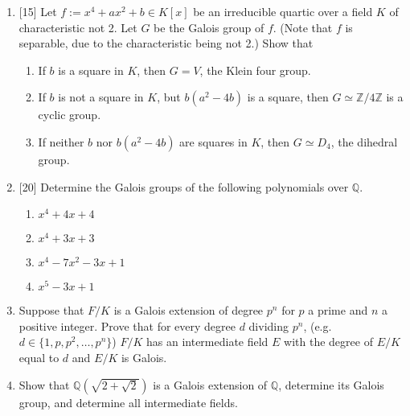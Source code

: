 \documentclass[12pt]{article}
\newcommand{\QQ}{{\mathbb Q}}
\newcommand{\ZZ}{{\mathbb Z}}
\begin{document}
\begin{enumerate}


\item {[15]}
  Let $f:=x^4+ax^2+b\in K[x]$ be an irreducible quartic over a field $K$ of characteristic not 2.
  Let $G$ be the Galois group of $f$.
  (Note that $f$ is separable, due to the characteristic being not 2.)
  Show that
  \begin{enumerate}
    \item If $b$ is a square in $K$, then $G=V$, the Klein four group.
    \item If $b$ is not a square in $K$, but $b(a^2-4b)$ is a square, then $G\simeq \ZZ/4\ZZ$ is a cyclic group.
    \item If neither $b$ nor $b(a^2-4b)$ are squares in $K$, then $G\simeq D_4$, the dihedral group.
  \end{enumerate}
\vspace{-2pt}

\item {[20]} Determine the Galois groups of the following polynomials over $\QQ$. 
  \begin{enumerate}
    \item $x^4+4x+4$
    \item $x^4+3x+3$
    \item $x^4-7x^2-3x+1$
    \item $x^5-3x+1$
  \end{enumerate}
\vspace{-2pt}

\item   Suppose that $F/K$ is a Galois extension of degree $p^n$ for $p$ a prime and $n$ a positive integer.
        Prove that for every degree $d$ dividing $p^n$, (e.g. $d\in\{1,p,p^2,\dotsc,p^n\}$) $F/K$ has an intermediate field $E$ with the
        degree of $E/K$ equal to $d$ and $E/K$ is Galois.
   \vspace{-2pt}

\item Show that  $\QQ(\sqrt{2+\sqrt{2}})$ is a Galois extension of $\QQ$, determine its Galois group, and determine all intermediate fields.
   \vspace{-2pt}


\end{enumerate}
\end{document}
